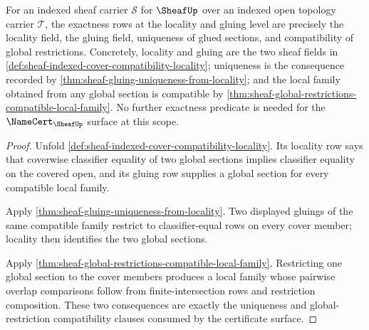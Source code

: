 \begin{theorem}
\label{thm:sheaf-locality-gluing-exactness-scope}
For an indexed sheaf carrier $\mathcal{S}$ for $\SheafUp$ over an indexed open topology carrier $\mathcal{T}$, the exactness rows at the locality and gluing level are precisely the locality field, the gluing field, uniqueness of glued sections, and compatibility of global restrictions. Concretely, locality and gluing are the two sheaf fields in \autoref{def:sheaf-indexed-cover-compatibility-locality}; uniqueness is the consequence recorded by \autoref{thm:sheaf-gluing-uniqueness-from-locality}; and the local family obtained from any global section is compatible by \autoref{thm:sheaf-global-restrictions-compatible-local-family}. No further exactness predicate is needed for the $\NameCert_{\SheafUp}$ surface at this scope.
\end{theorem}
\begin{proof}
Unfold \autoref{def:sheaf-indexed-cover-compatibility-locality}. Its locality row says that coverwise classifier equality of two global sections implies classifier equality on the covered open, and its gluing row supplies a global section for every compatible local family.

Apply \autoref{thm:sheaf-gluing-uniqueness-from-locality}. Two displayed gluings of the same compatible family restrict to classifier-equal rows on every cover member; locality then identifies the two global sections.

Apply \autoref{thm:sheaf-global-restrictions-compatible-local-family}. Restricting one global section to the cover members produces a local family whose pairwise overlap comparisons follow from finite-intersection rows and restriction composition. These two consequences are exactly the uniqueness and global-restriction compatibility clauses consumed by the certificate surface.
\end{proof}

